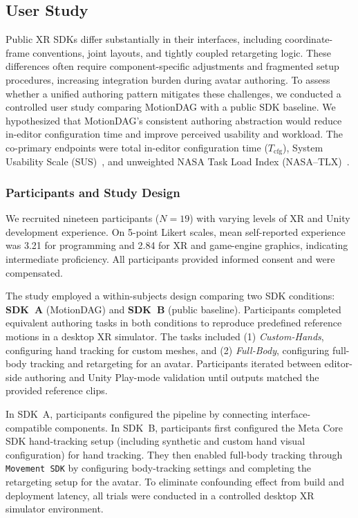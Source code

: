 \subsection{User Study}\label{subsec:userstudy}

Public XR SDKs differ substantially in their interfaces, including coordinate-frame conventions, joint layouts, and tightly coupled retargeting logic. These differences often require component-specific adjustments and fragmented setup procedures, increasing integration burden during avatar authoring.
To assess whether a unified authoring pattern mitigates these challenges, we conducted a controlled user study comparing MotionDAG with a public SDK baseline. We hypothesized that MotionDAG’s consistent authoring abstraction would reduce in-editor configuration time and improve perceived usability and workload.
The co-primary endpoints were total in-editor configuration time ($T_{\mathrm{cfg}}$), System Usability Scale (SUS)~\cite{brooke1996sus}, and unweighted NASA Task Load Index (NASA--TLX)~\cite{hart1988nasa_tlx}.

\subsubsection{Participants and Study Design}
We recruited nineteen participants ($N = 19$) with varying levels of XR and Unity development experience. On 5-point Likert scales, mean self-reported experience was 3.21 for programming and 2.84 for XR and game-engine graphics, indicating intermediate proficiency. 
All participants provided informed consent and were compensated.

The study employed a within-subjects design comparing two SDK conditions: \textbf{SDK~A} (MotionDAG) and \textbf{SDK~B} (public baseline). Participants completed equivalent authoring tasks in both conditions to reproduce predefined reference motions in a desktop XR simulator. 
The tasks included (1) \textit{Custom-Hands}, configuring hand tracking for custom meshes, and (2) \textit{Full-Body}, configuring full-body tracking and retargeting for an avatar.
Participants iterated between editor-side authoring and Unity Play-mode validation until outputs matched the provided reference clips.

In SDK~A, participants configured the pipeline by connecting interface-compatible components. 
In SDK~B, participants first configured the Meta Core SDK hand-tracking setup (including synthetic and custom hand visual configuration) for hand tracking.
They then enabled full-body tracking through \texttt{Movement SDK} by configuring body-tracking settings and completing the retargeting setup for the avatar.
To eliminate confounding effect from build and deployment latency, all trials were conducted in a controlled desktop XR simulator environment.

